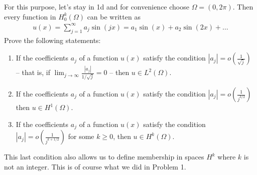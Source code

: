 \documentclass[leqno]{article}
\theoremstyle{nonumberplain}
\begin{document}
For this purpose, let's stay in 1d and for convenience choose
$\Omega=(0,2\pi)$. Then every function in $H^k_0(\Omega)$ can be
written as
\begin{align*}
  u(x) = \sum_{j=1}^\infty a_j \sin(jx) = a_1 \sin(x) + a_2 \sin(2x) + \ldots
\end{align*}
Prove the following statements:
\begin{enumerate}
\item If the coefficients $a_j$ of a function $u(x)$ satisfy the condition 
$|a_j| = o\left(\frac{1}{\sqrt{j}}\right)$ -- that is, if 
$\lim_{j\rightarrow\infty}\frac{|a_j|}{1/\sqrt{j}}=0$ -- then $u\in L^2(\Omega)$.

\item If the coefficients $a_j$ of a function $u(x)$ satisfy the condition 
$|a_j| = o\left(\frac{1}{j^{3/2}}\right)$ then $u\in H^1(\Omega)$.

\item If the coefficients $a_j$ of a function $u(x)$ satisfy the condition 
$|a_j| = o\left(\frac{1}{j^{k+1/2}}\right)$ for some $k\ge 0$, then $u\in H^k(\Omega)$.
\end{enumerate}
This last condition also allows us to define membership in spaces
$H^k$ where $k$ is not an integer. This is of course what we did in
Problem 1.
\end{document}
